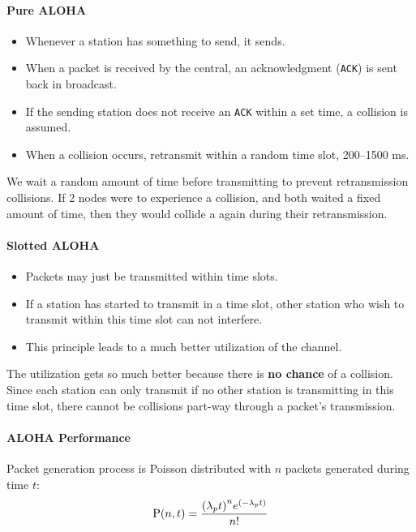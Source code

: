 \paragraph{Pure ALOHA}\label{par:Pure_ALOHA}
\begin{itemize}[noitemsep]
\item Whenever a station has something to send, it sends.
\item When a packet is received by the central, an acknowledgment (\texttt{ACK}) is sent back in broadcast.
\item If the sending station does not receive an \texttt{ACK} within a set time, a collision is assumed.
\item When a collision occurs, retransmit within a random time slot, 200--1500 ms.
\end{itemize}

\begin{remark*}
  We wait a random amount of time before transmitting to prevent retransmission collisions.
  If 2 nodes were to experience a collision, and both waited a fixed amount of time, then they would collide a again during their retransmission.
\end{remark*}

\paragraph{Slotted ALOHA}\label{par:Slotted_ALOHA}
\begin{itemize}[noitemsep]
\item Packets may just be transmitted within time slots.
\item If a station has started to transmit in a time slot, other station who wish to transmit within this time slot can not interfere.
\item This principle leads to a much better utilization of the channel.
\end{itemize}

The utilization gets so much better because there is \textbf{no chance} of a collision.
Since each station can only transmit if no other station is transmitting in this time slot, there cannot be collisions part-way through a packet's transmission.

\paragraph{ALOHA Performance}\label{par:ALOHA_Performance}
Packet generation process is Poisson distributed with $n$ packets generated during time $t$:
\begin{equation*}
  \operatorname{\operatorname{P}}(n, t) = \frac{{\left( \lambda_{p}t \right)}^{n} e^{(-\lambda_{p}t)}}{n!}
\end{equation*}

